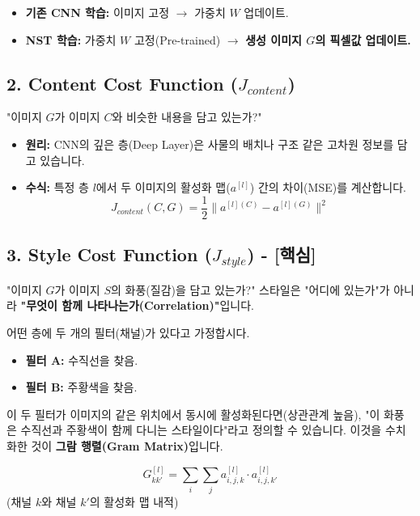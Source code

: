 \documentclass[11pt,a4paper]{book}
\theoremstyle{definition}
\begin{document}
\begin{itemize}
    \item \textbf{기존 CNN 학습:} 이미지 고정 $\rightarrow$ 가중치 $W$ 업데이트.
    \item \textbf{NST 학습:} 가중치 $W$ 고정(Pre-trained) $\rightarrow$ \textbf{생성 이미지 $G$의 픽셀값 업데이트.}
\end{itemize}

\subsection{2. Content Cost Function ($J_{content}$)}
"이미지 $G$가 이미지 $C$와 비슷한 내용을 담고 있는가?"
\begin{itemize}
    \item \textbf{원리:} CNN의 깊은 층(Deep Layer)은 사물의 배치나 구조 같은 고차원 정보를 담고 있습니다.
    \item \textbf{수식:} 특정 층 $l$에서 두 이미지의 활성화 맵($a^{[l]}$) 간의 차이(MSE)를 계산합니다.
    $$ J_{content}(C, G) = \frac{1}{2} \| a^{[l](C)} - a^{[l](G)} \|^2 $$
\end{itemize}

\subsection{3. Style Cost Function ($J_{style}$) - [핵심]}
"이미지 $G$가 이미지 $S$의 화풍(질감)을 담고 있는가?"
스타일은 "어디에 있는가"가 아니라 \textbf{"무엇이 함께 나타나는가(Correlation)"}입니다.

\begin{analogybox}[title={그람 행렬의 직관}]
어떤 층에 두 개의 필터(채널)가 있다고 가정합시다.
\begin{itemize}
    \item \textbf{필터 A:} 수직선을 찾음.
    \item \textbf{필터 B:} 주황색을 찾음.
\end{itemize}
이 두 필터가 이미지의 같은 위치에서 동시에 활성화된다면(상관관계 높음), "이 화풍은 수직선과 주황색이 함께 다니는 스타일이다"라고 정의할 수 있습니다. 이것을 수치화한 것이 \textbf{그람 행렬(Gram Matrix)}입니다.
\end{analogybox}

\begin{formulabox}[title={Gram Matrix ($G^{[l]}$)}]
$$ G_{kk'}^{[l]} = \sum_{i} \sum_{j} a_{i,j,k}^{[l]} \cdot a_{i,j,k'}^{[l]} $$
(채널 $k$와 채널 $k'$의 활성화 맵 내적)
\end{formulabox}
\end{document}
